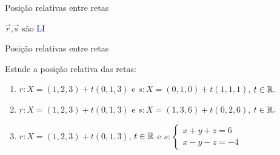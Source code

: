 \begin{frame}[label=pos-retas]{Posição relativas entre retas}
{{\begin{minipage}{0.3\textwidth}

{\small {\color{blue}$\vec{r}$},{\color{red}$\vec{s}$} são \textcolor{blue}{LI}}
\end{minipage}
}}
\end{frame}


\begin{frame}[label=pos-retas]{Posição relativas entre retas}

\begin{exe}
Estude a posição relativa das retas:
\begin{enumerate}
\item $r: X=(1,2,3)+t(0,1,3)$ e $s: X=(0,1,0)+t(1,1,1)$, $t\in \mathbb{R}.$

\item $r: X=(1,2,3)+t(0,1,3)$ e $s: X=(1,3,6)+t(0,2,6)$, $t\in \mathbb{R}.$

\item $r: X=(1,2,3)+t(0,1,3)$, $t\in \mathbb{R}$ e 
$s: \begin{cases}
x+y+z=6\\
x-y-z=-4
\end{cases}$
\end{enumerate}
\end{exe}

\end{frame}
